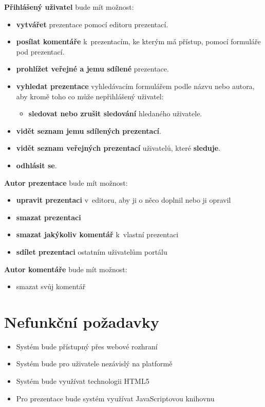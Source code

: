 \documentclass[11pt,twoside,a4paper]{book}
\begin{document}
\noindent \textbf{Přihlášený uživatel} bude mít možnost:
\begin{itemize}
	\item \textbf{vytvářet} prezentace pomocí editoru prezentací.
	\item \textbf{posílat komentáře} k~prezentacím, ke kterým má přístup, pomocí formuláře pod prezentací.
	\item \textbf{prohlížet veřejné a jemu sdílené} prezentace.
	\item \textbf{vyhledat prezentace} vyhledávacím formulářem podle názvu nebo autora, aby kromě toho co může nepřihlášený uživatel:
		\begin{itemize}
		\item \textbf{sledovat nebo zrušit sledování} hledaného uživatele.
		\end{itemize}
	\item \textbf{vidět seznam jemu sdílených prezentací}.
	\item \textbf{vidět seznam veřejných prezentací} uživatelů, které \textbf{sleduje}.
	\item \textbf{odhlásit se}.
\end{itemize}


\noindent \textbf{Autor prezentace} bude mít možnost:
\begin{itemize}
	\item \textbf{upravit prezentaci} v~editoru, aby ji o něco doplnil nebo ji opravil
	\item \textbf{smazat prezentaci}
	\item \textbf{smazat jakýkoliv komentář} k~vlastní prezentaci
	\item \textbf{sdílet prezentaci} ostatním uživatelům portálu
\end{itemize}


\noindent \textbf{Autor komentáře} bude mít možnost:
\begin{itemize}
	\item smazat svůj komentář
\end{itemize}


\section{Nefunkční požadavky}
\begin{itemize}
	\item Systém bude přístupný přes webové rozhraní
	\item Systém bude pro uživatele nezávislý na platformě
	\item Systém bude využívat technologii HTML5
	\item Pro prezentace bude systém využívat JavaScriptovou knihovnu
\end{itemize}
\end{document}
